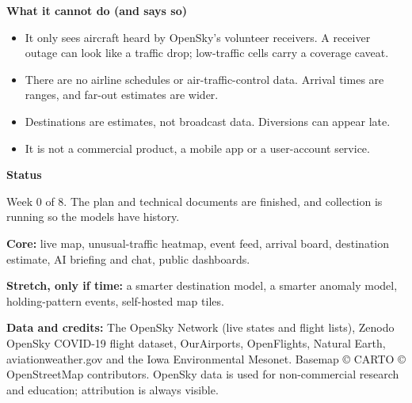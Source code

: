 \documentclass[10.5pt]{article}
\begin{document}
\vspace{4pt}
\begin{minipage}[t]{0.55\linewidth}
\begin{warncard}
{\bfseries What it cannot do (and says so)}
\begin{itemize}[leftmargin=1.0em,itemsep=1.5pt,topsep=2pt]
  \item It only sees aircraft heard by OpenSky's volunteer receivers. A receiver outage can look like a traffic drop; low-traffic cells carry a coverage caveat.
  \item There are no airline schedules or air-traffic-control data. Arrival times are ranges, and far-out estimates are wider.
  \item Destinations are estimates, not broadcast data. Diversions can appear late.
  \item It is not a commercial product, a mobile app or a user-account service.
\end{itemize}
\end{warncard}
\end{minipage}\hfill
\begin{minipage}[t]{0.42\linewidth}
\begin{accentcard}
{\bfseries Status}

\vspace{2pt}
{\small Week 0 of 8. The plan and technical documents are finished, and collection is running so the models have history.}

\vspace{2pt}
{\small \textbf{Core:} live map, unusual-traffic heatmap, event feed, arrival board, destination estimate, AI briefing and chat, public dashboards.}

\vspace{2pt}
{\small \textbf{Stretch, only if time:} a smarter destination model, a smarter anomaly model, holding-pattern events, self-hosted map tiles.}
\end{accentcard}
\end{minipage}

\vspace{4pt}
{\footnotesize\color{papermuted}
\textbf{Data and credits:} The OpenSky Network (live states and flight lists), Zenodo OpenSky COVID-19 flight dataset, OurAirports, OpenFlights, Natural Earth, aviationweather.gov and the Iowa Environmental Mesonet. Basemap © CARTO © OpenStreetMap contributors. OpenSky data is used for non-commercial research and education; attribution is always visible.
}
\end{document}
